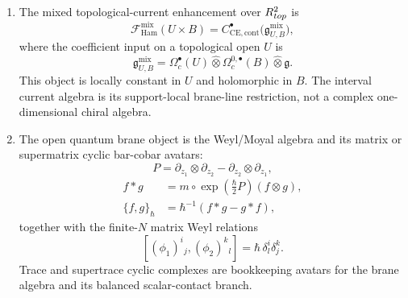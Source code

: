 \begin{stmt}
\begin{enumerate}[label=(\arabic*)]
    \item The mixed topological-current enhancement over
      \(R^2_{top}\) is
      \[
        \mathcal F_{\mathrm{Ham}}^{\mathrm{mix}}(U\times B)
        =
        C^\bullet_{\mathrm{CE},\mathrm{cont}}
        \bigl(\mathfrak g^{\mathrm{mix}}_{U,B}\bigr),
      \]
      where the coefficient input on a topological open \(U\) is
      \[
        \mathfrak g^{\mathrm{mix}}_{U,B}
        =
        \Omega^\bullet_c(U)\widehat\otimes
        \Omega^{0,\bullet}_c(B)\widehat\otimes\mathfrak g .
      \]
      This object is locally constant in \(U\) and holomorphic in \(B\).
      The interval current algebra is its support-local brane-line
      restriction, not a complex one-dimensional chiral algebra.

    \item The open quantum brane object is the Weyl/Moyal algebra and its
      matrix or supermatrix cyclic bar-cobar avatars:
      \[
        P=\partial_{z_1}\otimes\partial_{z_2}
        -\partial_{z_2}\otimes\partial_{z_1},
      \]
      \[
        \begin{aligned}
        f*g&=m\circ\exp\!\left(\frac{\hbar}{2}P\right)(f\otimes g),\\
        \{f,g\}_\hbar&=\hbar^{-1}(f*g-g*f),
        \end{aligned}
      \]
      together with the finite-\(N\) matrix Weyl relations
      \[
        [(\phi_1)^i{}_j,(\phi_2)^k{}_l]
        =\hbar\,\delta^i_l\delta^k_j .
      \]
      Trace and supertrace cyclic complexes are bookkeeping avatars for
      the brane algebra and its balanced scalar-contact branch.


\end{enumerate}
\end{stmt}
